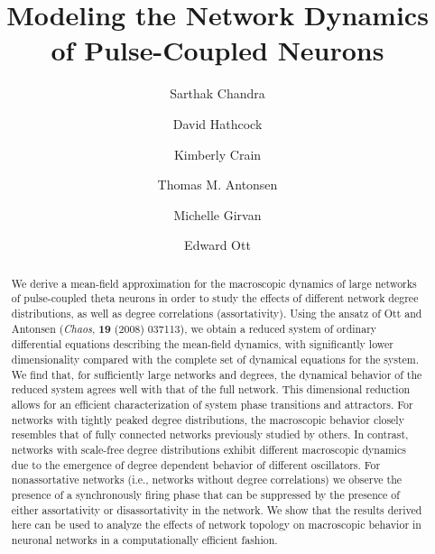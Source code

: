 \documentclass[%
 aip,
 sd,%
 amsmath,amssymb,
 reprint,%
]{revtex4-1}
\begin{document}
\title{Modeling the Network Dynamics of Pulse-Coupled Neurons}

\author{Sarthak Chandra}
\author{David Hathcock}
\author{Kimberly Crain}
\author{Thomas M. Antonsen}
\author{Michelle Girvan}
\author{Edward Ott}

\begin{abstract}
We derive a mean-field approximation for the macroscopic dynamics of large networks of pulse-coupled theta neurons in order to study the effects of different network degree distributions, as well as degree correlations (assortativity). Using the ansatz of Ott and Antonsen (\textit{Chaos}, \textbf{19} (2008) 037113), we obtain a reduced system of ordinary differential equations describing the mean-field dynamics, with significantly lower dimensionality compared with the complete set of dynamical equations for the system. We find that, for sufficiently large networks and degrees, the dynamical behavior of the reduced system agrees well with that of the full network. This dimensional reduction allows for an efficient characterization of system phase transitions and attractors. For networks with tightly peaked degree distributions, the macroscopic behavior closely resembles that of fully connected networks previously studied by others. In contrast, networks with scale-free degree distributions exhibit different macroscopic dynamics due to the emergence of degree dependent behavior of different oscillators. For nonassortative networks (i.e., networks without degree correlations) we observe the presence of a synchronously firing phase that can be suppressed by the presence of either assortativity or disassortativity in the network. We show that the results derived here can be used to analyze the effects of network topology on macroscopic behavior in neuronal networks in a computationally efficient fashion.
\end{abstract}
\end{document}
